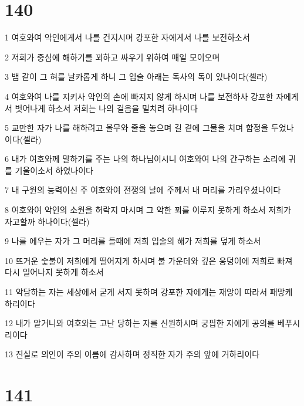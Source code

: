 \chapter{140}

\par 1 여호와여 악인에게서 나를 건지시며 강포한 자에게서 나를 보전하소서
\par 2 저희가 중심에 해하기를 꾀하고 싸우기 위하여 매일 모이오며
\par 3 뱀 같이 그 혀를 날카롭게 하니 그 입술 아래는 독사의 독이 있나이다(셀라)
\par 4 여호와여 나를 지키사 악인의 손에 빠지지 않게 하시며 나를 보전하사 강포한 자에게서 벗어나게 하소서 저희는 나의 걸음을 밀치려 하나이다
\par 5 교만한 자가 나를 해하려고 올무와 줄을 놓으며 길 곁에 그물을 치며 함정을 두었나이다(셀라)
\par 6 내가 여호와께 말하기를 주는 나의 하나님이시니 여호와여 나의 간구하는 소리에 귀를 기울이소서 하였나이다
\par 7 내 구원의 능력이신 주 여호와여 전쟁의 날에 주께서 내 머리를 가리우셨나이다
\par 8 여호와여 악인의 소원을 허락지 마시며 그 악한 꾀를 이루지 못하게 하소서 저희가 자고할까 하나이다(셀라)
\par 9 나를 에우는 자가 그 머리를 들때에 저희 입술의 해가 저희를 덮게 하소서
\par 10 뜨거운 숯불이 저희에게 떨어지게 하시며 불 가운데와 깊은 웅덩이에 저희로 빠져 다시 일어나지 못하게 하소서
\par 11 악담하는 자는 세상에서 굳게 서지 못하며 강포한 자에게는 재앙이 따라서 패망케 하리이다
\par 12 내가 알거니와 여호와는 고난 당하는 자를 신원하시며 궁핍한 자에게 공의를 베푸시리이다
\par 13 진실로 의인이 주의 이름에 감사하며 정직한 자가 주의 앞에 거하리이다

\chapter{141}

